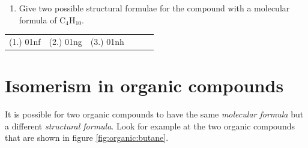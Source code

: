 {\begin{enumerate}
\item{Give two possible structural formulae for the compound with a molecular formula of C$_{4}$H$_{10}$.}
\end{enumerate}

\par \practiceinfo
\par \begin{tabular}[h]{cccccc}
(1.)	01nf	&
(2.)	01ng	&
(3.)	01nh	&
\end{tabular}

}






\section{Isomerism in organic compounds}
\label{sec:organic:isomer}

It is possible for two organic compounds to have the same \textit{molecular formula} but a different \textit{structural formula}. Look for example at the two organic compounds that are shown in figure \ref{fig:organic:butane}.

